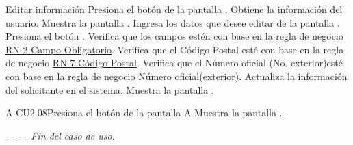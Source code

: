 	\begin{UCtrayectoria}{Editar información }
        \UCpaso[\UCactor]Presiona el botón  de la pantalla .
        \UCpaso[\UCsist] Obtiene la información del usuario.
		\UCpaso[\UCsist] Muestra la pantalla . 
		\UCpaso[\UCactor] Ingresa los datos que desee editar de la pantalla .
		\UCpaso[\UCactor] Presiona el botón . %
		\UCpaso[\UCsist] Verifica que los campos estén con base en la regla de negocio \hyperlink{RN2}{RN-2 Campo Obligatorio}. 
		\UCpaso[\UCsist] Verifica que el Código Postal esté con base en la regla de negocio \hyperlink{RN7}{RN-7 C\'odigo Postal}. 
		\UCpaso[\UCsist] Verifica que el Número oficial (No. exterior)esté con base en la regla de negocio \hyperlink{RN12}{Número oficial(exterior)}. 
        \UCpaso[\UCsist] Actualiza la información del solicitante en el sistema.
	    \UCpaso[\UCsist] Muestra la pantalla .
	
	\end{UCtrayectoria}
	


	

	
	

	\begin{UCtrayectoriaA}{A-CU2.08}{Presiona el botón  de la pantalla }{A}
		\UCpaso[\UCsist] Muestra la pantalla .
		\item[- -] - - {\em Fin del caso de uso.} 
	\end{UCtrayectoriaA}

